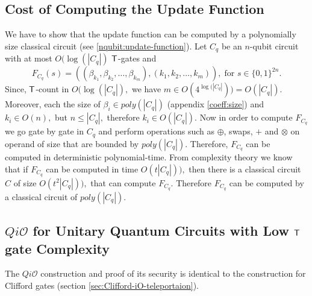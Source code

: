 \subsection{Cost of Computing the Update Function}
We have to show that the update function can be computed by a polynomially size classical circuit (see \ref{nqubit:update-function}). Let $C_q $ be an $n$-qubit circuit with at most $O(\log(|C_q|)$ ${\sf T}$-gates and
                                                                                        $$F_{C_q}(s)=((\beta_{k_1}, \beta_{k_2},\ldots, \beta_{k_m}),(k_1,k_2,\ldots, k_m)),\; \mbox{for } s\in\{0,1\}^{2n}.$$
Since, ${\sf T}$-count in $O(\log(|C_q|),$ we have $m\in O(4^{\log(|C_q|}))= O(|C_q|).$ Moreover, each the size of $\beta_i \in poly(|C_q|)$ (appendix \ref{coeff:size}) and $k_i \in O(n),$ but $n\leq |C_q|,$ therefore  $k_i \in O(|C_q|).$ Now in order to compute $F_{C_q}$ we go gate by gate in $C_q$ and perform operations such as $\oplus$, swaps, $+$ and $\otimes$ on operand of size that are bounded by $poly(|C_q|).$ Therefore, $F_{C_q}$ can be computed in deterministic polynomial-time. From complexity theory we know that
if $F_{C_q}$ can be computed in time $O(t|C_q|)),$ then there is a classical circuit $C$ of size $O(t^2|C_q|)),$ that can compute $F_{C_q}$. %
Therefore $F_{C_q}$ can be computed by a classical circuit of $poly(|C_q|).$

\subsection{$Qi\mathcal{O}$ for Unitary Quantum Circuits with Low ${\sf T}$ gate Complexity}
The $Qi\mathcal{O}$ construction and proof of its security is identical to the  construction for Clifford gates (section \ref{sec:Clifford-iO-teleportaion}).



